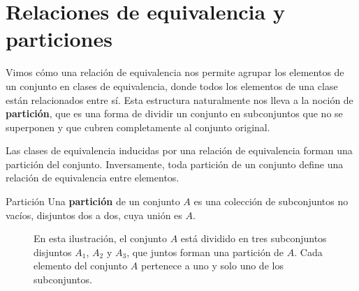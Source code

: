 \section{Relaciones de equivalencia y particiones}

Vimos cómo una relación de equivalencia nos permite agrupar los elementos de un conjunto en clases de equivalencia, donde todos los elementos de una clase están relacionados entre sí. Esta estructura naturalmente nos lleva a la noción de \textbf{partición}, que es una forma de dividir un conjunto en subconjuntos que no se superponen y que cubren completamente al conjunto original.

Las clases de equivalencia inducidas por una relación de equivalencia forman una partición del conjunto. 
Inversamente, toda partición de un conjunto define una relación de equivalencia entre elementos. 

\bigskip
\begin{definitionblock}{Partición}
Una \textbf{partición} de un conjunto $A$ es una colección de subconjuntos no vacíos, disjuntos dos a dos, cuya unión es $A$.
\end{definitionblock}

\begin{figure}[h]
\begin{center}
\end{center}
\caption{En esta ilustración, el conjunto $A$ está dividido en tres subconjuntos disjuntos $A_1$, $A_2$ y $A_3$, que juntos forman una partición de $A$. Cada elemento del conjunto $A$ pertenece a uno y solo uno de los subconjuntos.}
\end{figure}



